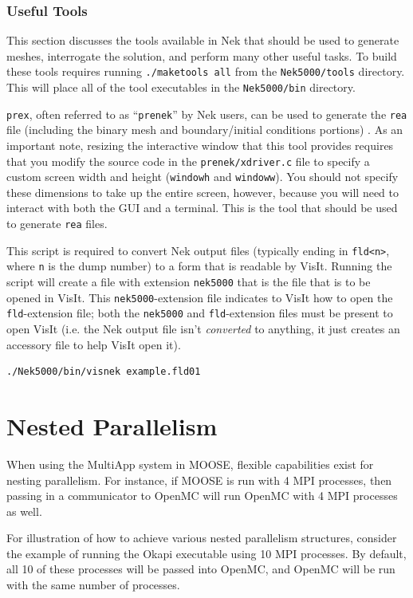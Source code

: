 \documentclass[10pt]{article}
\newcounter{subsubsubsection}[subsubsection]
\numberwithin{equation}{section} %
\begin{document}
\subsubsection{Useful Tools}
This section discusses the tools available in Nek that should be used to generate meshes, interrogate the solution, and perform many other useful tasks. To build these tools requires running {\tt ./maketools all} from the {\tt Nek5000/tools} directory. This will place all of the tool executables in the {\tt Nek5000/bin} directory.

{\tt prex}, often referred to as ``{\tt prenek}'' by Nek users, can be used to generate the {\tt rea} file (including the binary mesh and boundary/initial conditions portions) . As an important note, resizing the interactive window that this tool provides requires that you modify the source code in the {\tt prenek/xdriver.c} file to specify a custom screen width and height ({\tt windowh} and {\tt windoww}). You should not specify these dimensions to take up the entire screen, however, because you will need to interact with both the GUI and a terminal. This is the tool that should be used to generate {\tt rea} files. 

This script is required to convert Nek output files (typically ending in {\tt fld<n>}, where {\tt n} is the dump number) to a form that is readable by VisIt. Running the script will create a file with extension {\tt nek5000} that is the file that is to be opened in VisIt. This {\tt nek5000}-extension file indicates to VisIt how to open the {\tt fld}-extension file; both the {\tt nek5000} and {\tt fld}-extension files must be present to open VisIt (i.e. the Nek output file isn't {\it converted} to anything, it just creates an accessory file to help VisIt open it).

\begin{lstlisting}
./Nek5000/bin/visnek example.fld01
\end{lstlisting}

\clearpage
\section{Nested Parallelism}
When using the MultiApp system in MOOSE, flexible capabilities exist for nesting parallelism. For instance, if MOOSE is run with 4 MPI processes, then passing in a communicator to OpenMC will run OpenMC with 4 MPI processes as well. 

For illustration of how to achieve various nested parallelism structures, consider the example of running the Okapi executable using 10 MPI processes. By default, all 10 of these processes will be passed into OpenMC, and OpenMC will be run with the same number of processes. 
\end{document}
